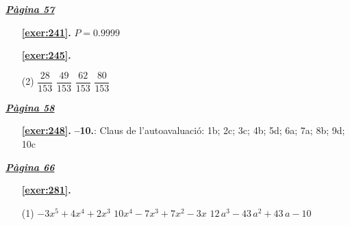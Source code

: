 
\hyperlink{page.57}{\textbf{\em Pàgina 57}}
\begin{enumerate}
\item[\fontfamily{phv}\selectfont\color{blue}\textbf{\ref{exer:241}. }] \label{ans:241} 
$P=0.9999$
 \end{enumerate}
\begin{enumerate}



 \item[\fontfamily{phv}\selectfont\color{blue}\textbf{\ref{exer:245}. }] \label{ans:245}
 \begin{tasks}[column-sep=1em, item-indent=1.3333em](2)
	 \task $\dfrac {28}{153}$
	 \task $\dfrac {49}{153}$
	 \task $\dfrac {62}{153}$
	 \task $\dfrac {80}{153}$
\end{tasks}
 \end{enumerate}
\vspace{0.3cm}


\hyperlink{page.58}{\textbf{\em Pàgina 58}}
\begin{enumerate}
\item[\fontfamily{phv}\selectfont\color{blue}\textbf{\ref{exer:248}. }] \label{ans:248} 
\textbf {--10.}: Claus de l'autoavaluació: 1b; 2c; 3c; 4b; 5d; 6a; 7a; 8b; 9d; 10c
 \end{enumerate}

 \vspace{1cm} 
 

\vspace{0.3cm}


\hyperlink{page.66}{\textbf{\em Pàgina 66}}
\begin{enumerate}



 \item[\fontfamily{phv}\selectfont\color{blue}\textbf{\ref{exer:281}. }] \label{ans:281}
 \begin{tasks}[column-sep=1em, item-indent=1.3333em](1)
	 \task $-3x^5+4x^4+2x^3$
	 \task $10x^4-7x^3+7x^2-3x$
	 \task $12\,a^3-43\,a^2+43\,a-10$
\end{tasks}
 \end{enumerate}
\vspace{0.3cm}

